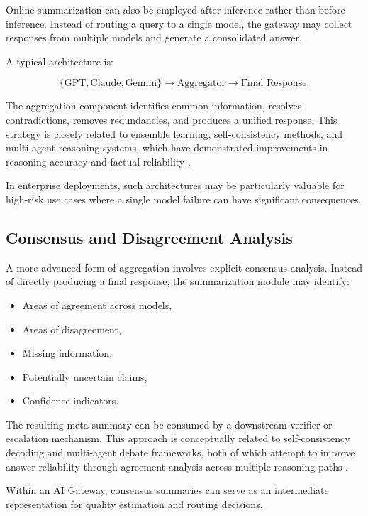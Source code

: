 \documentclass[11pt,a4paper]{article}
\begin{document}
Online summarization can also be employed after inference rather than before inference. Instead of routing a query to a single model, the gateway may collect responses from multiple models and generate a consolidated answer.

A typical architecture is:

\[
\{\text{GPT}, \text{Claude}, \text{Gemini}\}
\rightarrow
\text{Aggregator}
\rightarrow
\text{Final Response}.
\]

The aggregation component identifies common information, resolves contradictions, removes redundancies, and produces a unified response. This strategy is closely related to ensemble learning, self-consistency methods, and multi-agent reasoning systems, which have demonstrated improvements in reasoning accuracy and factual reliability \cite{wang2023selfconsistency,debate2024}.

In enterprise deployments, such architectures may be particularly valuable for high-risk use cases where a single model failure can have significant consequences.

\subsection{Consensus and Disagreement Analysis}

A more advanced form of aggregation involves explicit consensus analysis. Instead of directly producing a final response, the summarization module may identify:

\begin{itemize}
\item Areas of agreement across models,
\item Areas of disagreement,
\item Missing information,
\item Potentially uncertain claims,
\item Confidence indicators.
\end{itemize}

The resulting meta-summary can be consumed by a downstream verifier or escalation mechanism. This approach is conceptually related to self-consistency decoding and multi-agent debate frameworks, both of which attempt to improve answer reliability through agreement analysis across multiple reasoning paths \cite{wang2023selfconsistency,debate2024}.

Within an AI Gateway, consensus summaries can serve as an intermediate representation for quality estimation and routing decisions.
\end{document}
